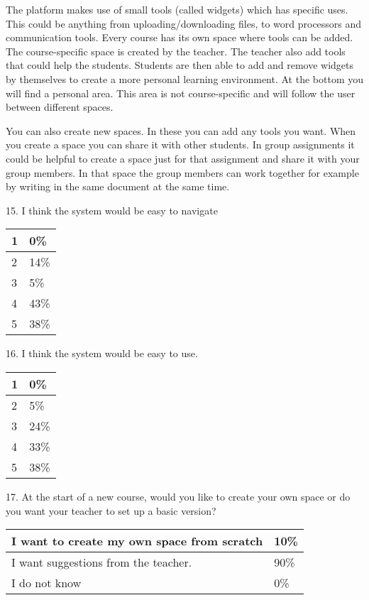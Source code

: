 The platform makes use of small tools (called widgets) which has specific uses. This could be anything from uploading/downloading files, to word processors and communication tools.
Every course has its own space where tools can be added. The course-specific space is created by the teacher. The teacher also add tools that could help the students. Students are then able to add and remove widgets by themselves to create a more personal learning environment. At the bottom you will find a personal area. This area is not course-specific and will follow the user between different spaces.

You can also create new spaces. In these you can add any tools you want. When you create a space you can share it with other students.
In group assignments it could be helpful to create a space just for that assignment and share it with your group members. In that space the group members can work together for example by writing in the same document at the same time.

15. I think the system would be easy to navigate

\begin{center}
    \begin{tabular}{ | l | l | }
    \hline
    1 & 0\% \\ \hline
	2 & 14\% \\ \hline
	3 & 5\% \\ \hline
	4 & 43\% \\ \hline
	5 & 38\% \\ \hline
    \end{tabular}
\end{center}

16. I think the system would be easy to use.

\begin{center}
    \begin{tabular}{ | l | l | }
    \hline
    1 & 0\% \\ \hline
	2 & 5\% \\ \hline
	3 & 24\% \\ \hline
	4 & 33\% \\ \hline
	5 & 38\% \\ \hline
    \end{tabular}
\end{center}

17. At the start of a new course, would you like to create your own space or do you want your teacher to set up a basic version?

\begin{center}
    \begin{tabular}{ | l | l | }
    \hline
    I want to create my own space from scratch & 10\% \\ \hline
	I want suggestions from the teacher. & 90\% \\ \hline
	I do not know & 0\% \\ \hline
    \end{tabular}
\end{center}

